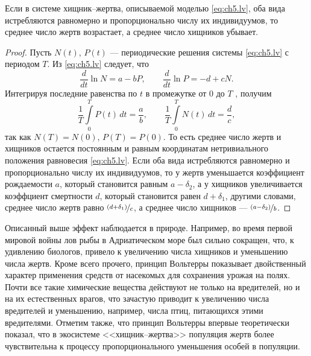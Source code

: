 \begin{assertion}
        Если в системе хищник--жертва, описываемой моделью \eqref{eq:ch5.lv}, оба вида истребляются равномерно и пропорционально числу их индивидуумов, то среднее число жертв возрастает, а среднее число хищников убывает.
\end{assertion}
\begin{proof}
        Пусть $N (t)$, $P (t)$ --- периодические решения системы \eqref{eq:ch5.lv} с периодом $T$. Из \eqref{eq:ch5.lv} следует, что
$$
        \frac{d}{dt}\ln N = a - bP,
\qquad
        \frac{d}{dt}\ln P = -d +cN.
$$
        Интегрируя последние равенства по $t$ в промежутке от $0$ до $T$ , получим
$$
        \frac{1}{T}\int\limits_0^TP(t)\,dt = \frac{a}{b},
\qquad
        \frac{1}{T}\int\limits_0^TN(t)\,dt = \frac{d}{c},
$$
так как $N(T) = N (0)$, $P (T) = P (0)$. То есть среднее число жертв и хищников остается постоянным и равным координатам нетривиального положения равновесия \eqref{eq:ch5.lv}.
Если оба вида истребляются равномерно и пропорционально числу их индивидуумов, то у жертв уменьшается коэффициент рождаемости $a$, который становится равным $a-\delta_2$, а у хищников увеличивается коэффциент смертности $d$, который становится равен $d + \delta_1$, другими словами, среднее число жертв равно $\nicefrac{(d + \delta_1)}{c}$, а среднее
число хищников — $\nicefrac{(a - \delta_2 )}{b}$.

\end{proof}

Описанный выше эффект наблюдается в природе. Например, во время первой
мировой войны лов рыбы в Адриатическом море был сильно сокращен, что, к удивлению биологов, привело к увеличению числа хищников и уменьшению числа жертв. Кроме всего прочего, принцип Вольтерры показывает двойственный характер применения средств от насекомых для сохранения урожая на полях. Почти все такие химические вещества действуют не только на вредителей, но и на их естественных врагов, что зачастую приводит к увеличению числа вредителей и уменьшению, например, числа птиц, питающихся этими вредителями. Отметим также, что принцип Вольтерры впервые теоретически показал, что
в экосистеме <<хищник–жертва>> популяция жертв более чувствительна к процессу пропорционального уменьшения особей в популяции.